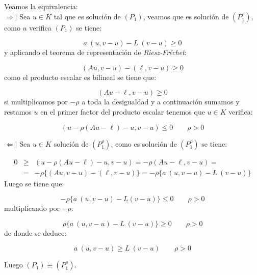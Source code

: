 \begin{demosteorema}
\begin{itemize}
Veamos la equivalencia:\newline \\
$\Rightarrow |$ Sea $u \in K$ tal que es soluci\'on de $(P_1)$, veamos que
es soluci\'on de $(P_1^{\rho} )$, como $u$ verifica $(P_1)$ se tiene:

\begin{displaymath}
a\ (u,v-u) - L\ (v-u) \ge 0
\end{displaymath}
y aplicando el teorema de representaci\'on de \emph{Riesz-Fr\'echet}:

\begin{displaymath}
(Au,v-u) - (\ell ,v-u) \ge 0
\end{displaymath}
como el producto escalar es bilineal se tiene que:

\begin{displaymath}
(Au-\ell ,v-u) \ge 0
\end{displaymath}
si multiplicamos por $-\rho $ a toda la desigualdad y a continuaci\'on
sumamos y restamos $u$ en el primer factor del producto escalar tenemos que
$u \in K$ verifica:

\begin{displaymath}
(u-\rho (Au-\ell)-u,v-u) \le 0 \qquad \rho > 0
\end{displaymath}

$\Leftarrow |$ Sea $u \in K$ soluci\'on de $(P_1^{\rho})$, como es soluci\'on
de $(P_1^{\rho})$ se tiene:

\begin{eqnarray*}
0 & \ge & (u-\rho (Au-\ell )-u,v-u) = -\rho (Au-\ell,v-u) = \\
  & =   & -\rho \{(Au,v-u) -(\ell ,v-u)\} = -\rho \{ a\ (u,v-u)-L\ (v-u) \}
\end{eqnarray*}
Luego se tiene que:

\begin{displaymath}
-\rho \{ a\ (u,v-u) - L(v-u)\} \le 0 \qquad \rho > 0
\end{displaymath}
multiplicando por $-\rho$:

\begin{displaymath}
\rho \{ a\ (u,v-u)-L\ (v-u) \} \ge 0	\qquad \rho > 0
\end{displaymath}
de donde se deduce:

\begin{displaymath}
a\ (u,v-u) \ge L\ (v-u)	\qquad \rho > 0
\end{displaymath}

Luego $(P_1) \equiv (P_1^{\rho})$.\newline


\end{itemize}
\end{demosteorema}
